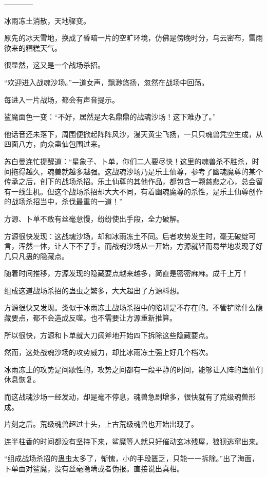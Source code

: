 
\begin{this_body}

------------

冰雨冻土消散，天地骤变。

原先的冰天雪地，换成了昏暗一片的空旷环境，仿佛是傍晚时分，乌云密布，雷雨欲来的糟糕天气。

很显然，这又是一个战场杀招。

“欢迎进入战魂沙场。”一道女声，飘渺悠扬，忽然在战场中回荡。

每进入一片战场，都会有声音提示。

鲨魔面色一变：“不好，居然是大名鼎鼎的战魂沙场！这下难办了。”

他话音还未落下，周围便掀起阵阵风沙，漫天黄尘飞扬，一只只魂兽凭空生成，从四面八方，向众蛊仙包围过来。

苏白曼连忙提醒道：“星象子、卜单，你们二人要尽快！这里的魂兽杀不胜杀，时间拖得越久，魂兽就越多越强。这战魂沙场乃是乐土仙尊，参考了幽魂魔尊的某个传承之后，创下的战场杀招。乐土仙尊的其他作品，都包含一颗慈悲之心，总会留有一线生机。但这个战场杀招却大大不同，有着幽魂魔尊的杀性，是乐土仙尊创作的战场杀招当中，杀伐最重的一道！”

方源、卜单不敢有丝毫怠慢，纷纷使出手段，全力破解。

方源很快发现：这战魂沙场，却和冰雨冻土不同。后者攻势发生时，毫无破绽可言，浑然一体，让人下不了手。而战魂沙场从一开始，方源就轻而易举地发现了好几只凡蛊的隐藏点。

随着时间推移，方源发现的隐藏要点越来越多，简直是密密麻麻。成千上万！

组成这道战场杀招的蛊虫之繁多，大大超出了方源料想。

方源很快又发现。类似于冰雨冻土战场杀招中的陷阱是不存在的。不管铲除什么隐藏要点，都不会造成反噬。也不需要让方源重新推算。

所以很快，方源和卜单就大刀阔斧地开始四下拆除这些隐藏要点。

然而，这处战魂沙场的攻势威力，却比冰雨冻土强上好几个档次。

冰雨冻土的攻势是间歇性的，攻势之间都有一段平静的时间，能够让入阵的蛊仙们休息恢复。

而这战魂沙场一经发动，却是毫不停息，魂兽急剧增多，很快就有了荒级魂兽形成。

片刻之后。荒级魂兽超过十头，上古荒级魂兽也开始出现了。

连半柱香的时间都没有坚持下来，鲨魔等人就只好催动玄冰残屋，狼狈逃窜出来。

“组成战场杀招的蛊虫太多了，惭愧，小的手段匮乏，只能一一拆除。”出了海面，卜单面对鲨魔，没有丝毫隐瞒或者伪报。直接说出真相。


\end{this_body}
